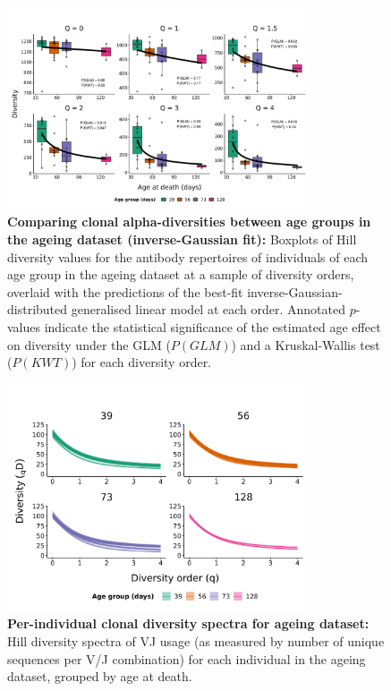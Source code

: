 \begin{figure}
\centering
\includegraphics[width = 0.8\textwidth]{_Figures/png/ageing-clone-diversity-solo-fit-igauss}
\caption[Comparing clonal alpha-diversities between age groups in the \igseq ageing dataset (inverse-Gaussian fit)]{\textbf{Comparing clonal alpha-diversities between age groups in the \igseq ageing dataset (inverse-Gaussian fit):} Boxplots of Hill diversity values for the antibody repertoires of individuals of each age group in the \igseq ageing dataset at a sample of diversity orders, overlaid with the predictions of the best-fit inverse-Gaussian-distributed generalised linear model at each order.  Annotated $p$-values indicate the statistical significance of the estimated age effect on diversity under the GLM ($P(GLM)$) and a Kruskal-Wallis test ($P(KWT)$) for each diversity order.}
\label{fig:igseq-ageing-clone-diversity-solo-fit-igauss}
\end{figure}

\begin{figure}
\centering
\includegraphics[width = 0.8\textwidth]{_Figures/png/ageing-VJ-diversity-solo-spectra}
\caption[Per-individual clonal diversity spectra for ageing dataset]{\textbf{Per-individual clonal diversity spectra for ageing dataset:} Hill diversity spectra of VJ usage (as measured by number of unique sequences per V/J combination) for each individual in the \igseq ageing dataset, grouped by age at death.}
\label{fig:igseq-ageing-vj-diversity-solo-spectra}
\end{figure}

